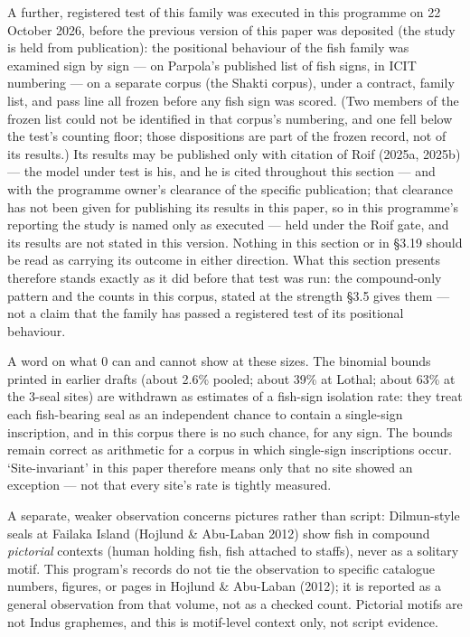 \documentclass[11pt]{article}
\begin{document}
A further, registered test of this family was executed in this
programme on 22 October 2026, before the previous version of this
paper was deposited (the study is held from publication): the
positional behaviour of the fish family was examined sign by sign
--- on Parpola's published list of fish signs, in ICIT numbering
--- on a separate corpus (the Shakti corpus), under a contract,
family list, and pass line all frozen before any fish sign was
scored. (Two members of the frozen list could not be identified in
that corpus's numbering, and one fell below the test's counting
floor; those dispositions are part of the frozen record, not of
its results.) Its results may be published only with citation of
Roif (2025a, 2025b) --- the model under test is his, and he is
cited throughout this section --- and with the programme owner's
clearance of the specific publication; that clearance has not been
given for publishing its results in this paper, so in this
programme's reporting the study is named only as executed --- held
under the Roif gate, and its results are not stated in this
version. Nothing in this section or in §3.19 should be read as
carrying its outcome in either direction. What this section
presents therefore stands exactly as it did before that test was
run: the compound-only pattern and the counts in this corpus,
stated at the strength §3.5 gives them --- not a claim that the
family has passed a registered test of its positional behaviour.

A word on what 0 can and cannot show at these sizes. The binomial bounds printed in earlier drafts (about 2.6\% pooled; about 39\% at Lothal; about 63\% at the 3-seal sites) are withdrawn as estimates of a fish-sign isolation rate: they treat each fish-bearing seal as an independent chance to contain a single-sign inscription, and in this corpus there is no such chance, for any sign. The bounds remain correct as arithmetic for a corpus in which single-sign inscriptions occur. `Site-invariant' in this paper therefore means only that no site showed an exception --- not that every site's rate is tightly measured.

A separate, weaker observation concerns pictures rather than script: Dilmun-style seals at Failaka Island (Hojlund \& Abu-Laban 2012) show fish in compound \emph{pictorial} contexts (human holding fish, fish attached to staffs), never as a solitary motif. This program's records do not tie the observation to specific catalogue numbers, figures, or pages in Hojlund \& Abu-Laban (2012); it is reported as a general observation from that volume, not as a checked count. Pictorial motifs are not Indus graphemes, and this is motif-level context only, not script evidence.
\end{document}
